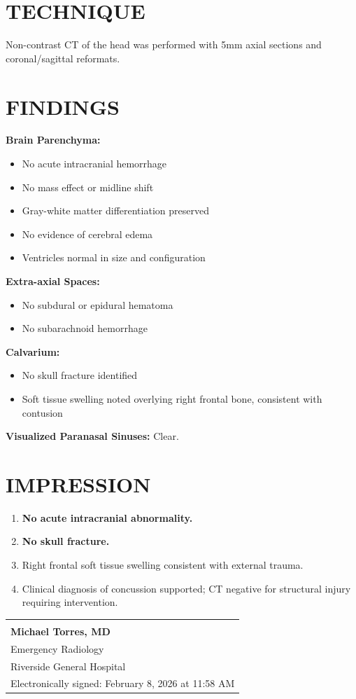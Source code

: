 \documentclass[11pt]{article}
\begin{document}
\section*{TECHNIQUE}

Non-contrast CT of the head was performed with 5mm axial sections and coronal/sagittal reformats.

\section*{FINDINGS}

\textbf{Brain Parenchyma:}
\begin{itemize}[nosep]
\item No acute intracranial hemorrhage
\item No mass effect or midline shift
\item Gray-white matter differentiation preserved
\item No evidence of cerebral edema
\item Ventricles normal in size and configuration
\end{itemize}

\textbf{Extra-axial Spaces:}
\begin{itemize}[nosep]
\item No subdural or epidural hematoma
\item No subarachnoid hemorrhage
\end{itemize}

\textbf{Calvarium:}
\begin{itemize}[nosep]
\item No skull fracture identified
\item Soft tissue swelling noted overlying right frontal bone, consistent with contusion
\end{itemize}

\textbf{Visualized Paranasal Sinuses:} Clear.

\section*{IMPRESSION}

\begin{enumerate}
\item \textbf{No acute intracranial abnormality.}
\item \textbf{No skull fracture.}
\item Right frontal soft tissue swelling consistent with external trauma.
\item Clinical diagnosis of concussion supported; CT negative for structural injury requiring intervention.
\end{enumerate}

\vspace{2em}

\begin{tabular}{@{}p{10cm}@{}}
\hrulefill \\
\textbf{Michael Torres, MD} \\
Emergency Radiology \\
Riverside General Hospital \\
Electronically signed: February 8, 2026 at 11:58 AM \\
\end{tabular}
\end{document}
